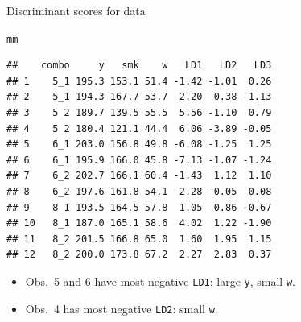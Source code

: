 \documentclass[unknownkeysallowed]{beamer}\usepackage[]{graphicx}\usepackage[]{color}
\makeatletter
\newcommand{\hlnum}[1]{\textcolor[rgb]{0.686,0.059,0.569}{#1}}%
\newcommand{\hlopt}[1]{\textcolor[rgb]{0,0,0}{#1}}%
\newcommand{\hlstd}[1]{\textcolor[rgb]{0.345,0.345,0.345}{#1}}%
\newcommand{\hlkwb}[1]{\textcolor[rgb]{0.69,0.353,0.396}{#1}}%
\newcommand{\hlkwd}[1]{\textcolor[rgb]{0.737,0.353,0.396}{\textbf{#1}}}%
\newenvironment{kframe}{%
 \def\at@end@of@kframe{}%
 \ifinner\ifhmode%
  \def\at@end@of@kframe{\end{minipage}}%
  \begin{minipage}{\columnwidth}%
 \fi\fi%
 \def\FrameCommand##1{\hskip\@totalleftmargin \hskip-\fboxsep
 \colorbox{shadecolor}{##1}\hskip-\fboxsep
     \hskip-\linewidth \hskip-\@totalleftmargin \hskip\columnwidth}%
 \MakeFramed {\advance\hsize-\width
   \@totalleftmargin\z@ \linewidth\hsize
   \@setminipage}}%
 {\par\unskip\endMakeFramed%
 \at@end@of@kframe}
\newenvironment{knitrout}{}{} %
\makeatother
\begin{document}
\begin{frame}[fragile]{Discriminant scores for data}

\begin{knitrout}\footnotesize
{}\color{fgcolor}\begin{kframe}
\begin{alltt}
\hlstd{mm}
\end{alltt}
\begin{verbatim}
##    combo     y   smk    w   LD1   LD2   LD3
## 1    5_1 195.3 153.1 51.4 -1.42 -1.01  0.26
## 2    5_1 194.3 167.7 53.7 -2.20  0.38 -1.13
## 3    5_2 189.7 139.5 55.5  5.56 -1.10  0.79
## 4    5_2 180.4 121.1 44.4  6.06 -3.89 -0.05
## 5    6_1 203.0 156.8 49.8 -6.08 -1.25  1.25
## 6    6_1 195.9 166.0 45.8 -7.13 -1.07 -1.24
## 7    6_2 202.7 166.1 60.4 -1.43  1.12  1.10
## 8    6_2 197.6 161.8 54.1 -2.28 -0.05  0.08
## 9    8_1 193.5 164.5 57.8  1.05  0.86 -0.67
## 10   8_1 187.0 165.1 58.6  4.02  1.22 -1.90
## 11   8_2 201.5 166.8 65.0  1.60  1.95  1.15
## 12   8_2 200.0 173.8 67.2  2.27  2.83  0.37
\end{verbatim}
\end{kframe}
\end{knitrout}
  
  \begin{itemize}
\item Obs.\ 5 and 6 have most negative \texttt{LD1}: large \texttt{y},
  small \texttt{w}.
\item Obs.\ 4 has most negative \texttt{LD2}: small \texttt{w}.
\end{itemize}

\end{frame}


\end{document}

